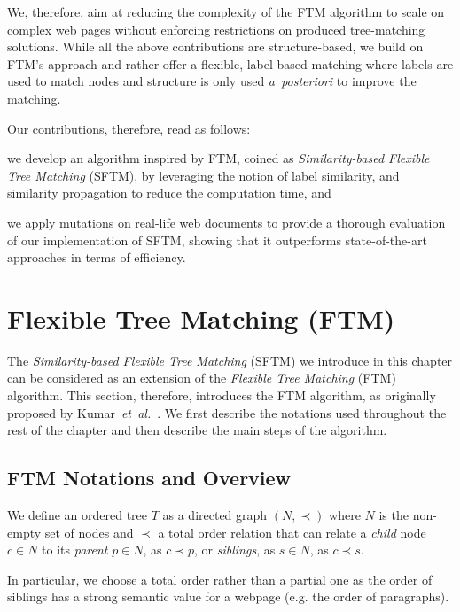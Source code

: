 We, therefore, aim at reducing the complexity of the FTM algorithm to scale on complex web pages without enforcing restrictions on produced tree-matching solutions.
While all the above contributions are structure-based, we build on FTM's approach and rather offer a flexible, label-based matching where labels are used to match nodes and structure is only used \emph{a~posteriori} to improve the matching.

Our contributions, therefore, read as follows:
\begin{compactenum}
    \item we develop an algorithm inspired by FTM, coined as \emph{Similarity-based Flexible Tree Matching} (SFTM), by leveraging the notion of label similarity, and similarity propagation to reduce the computation time, and
    \item we apply mutations on real-life web documents to provide a thorough evaluation of our implementation of SFTM, showing that it outperforms state-of-the-art approaches in terms of efficiency.
\end{compactenum}

\section{Flexible Tree Matching (FTM)}\label{sftm:sec:ftm}
The \emph{Similarity-based Flexible Tree Matching} (SFTM) we introduce in this chapter can be considered as an extension of the \textit{Flexible Tree Matching} (FTM) algorithm.
This section, therefore, introduces the FTM algorithm, as originally proposed by Kumar~\emph{et~al.}~\cite{Kumar2011_Bricolage}.
We first describe the notations used throughout the rest of the chapter and then describe the main steps of the algorithm.

\subsection{FTM Notations and Overview}
We define an ordered tree $T$ as a directed graph $(N,\prec)$ where $N$ is the non-empty set of nodes and $\prec$ a total order relation that can relate a \emph{child} node $c \in N$ to its \emph{parent} $p \in N$, as $c \prec p$, or \emph{siblings}, as $s \in N$, as $c \prec s$.

In particular, we choose a total order rather than a partial one as the order of siblings has a strong semantic value for a webpage (e.g. the order of paragraphs).

